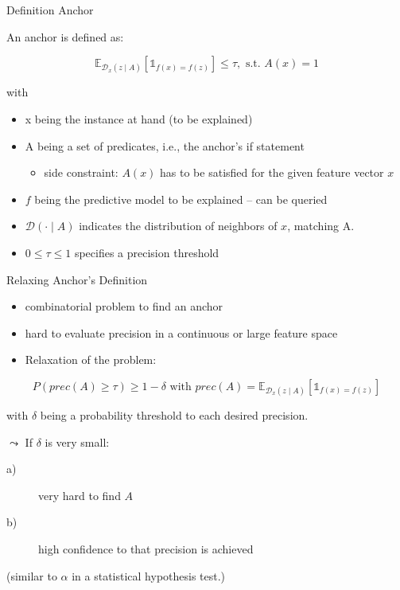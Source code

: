 \documentclass[aspectratio=169]{../latex_main/tntbeamer}  %
\begin{document}

\begin{frame}[c]{Definition Anchor}

An anchor is defined as:

\begin{equation}
    \mathbb{E}_{\mathcal{D}_x(z\mid A)} [\mathbb{1}_{f(x) = f(z)}] \leq \tau, \text{ s.t. } A(x) = 1
\end{equation}

with 

\begin{itemize}
    \item x being the instance at hand (to be explained)
    \item A being a set of predicates, i.e.,  the anchor's if statement
    \begin{itemize}
        \item side constraint: $A(x)$ has to be satisfied for the given feature vector $x$
    \end{itemize}
    \item $f$ being the predictive model to be explained -- can be queried
    \item $\mathcal{D}(\cdot \mid A)$ indicates the distribution of neighbors of $x$, matching A.
    \item $0 \leq \tau \leq 1$ specifies a precision threshold
\end{itemize}

\end{frame}


\begin{frame}[c]{Relaxing Anchor's Definition}

\begin{itemize}
    \item combinatorial problem to find an anchor
    \item hard to evaluate precision in a continuous or large feature space
    \item Relaxation of the problem:
\end{itemize}

$$P( prec(A) \geq \tau) \geq 1  - \delta \text{ with } prec(A)  = \mathbb{E}_{\mathcal{D}_x(z\mid A)} [\mathbb{1}_{f(x) = f(z)}] $$

with $\delta$ being a probability threshold to each desired precision.

\pause
\medskip

$\leadsto$ If $\delta$ is very small:
\begin{description}
    \item[a)] very hard to find $A$
    \item[b)] high confidence to that precision is achieved
\end{description}
(similar to $\alpha$ in a statistical hypothesis test.)

\end{frame}
\end{document}
